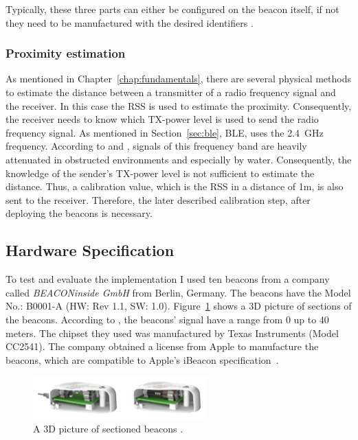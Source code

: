 \noindent Typically, these three parts can either be configured on the beacon itself, if not they need to be manufactured with the desired identifiers \citep{apple:getting_started,binside:ds}.

\subsubsection*{Proximity estimation}
As mentioned in Chapter~\ref{chap:fundamentals}, there are several physical methods to estimate the distance between a transmitter of a radio frequency signal and the receiver. In this case the \acf{RSS} is used to estimate the proximity. Consequently, the receiver needs to know which \acs{TX}-power level is used to send the radio frequency signal. As mentioned in Section~\ref{sec:ble}, \ac{BLE}, uses the 2.4~GHz frequency. According to \citet{apple:getting_started} and \citet{binside:ds}, signals of this frequency band are heavily attenuated in obstructed environments and especially by water. Consequently, the knowledge of the sender's \acs{TX}-power level is not sufficient to estimate the distance. Thus, a calibration value, which is the \acl{RSS} in a distance of 1m, is also sent to the receiver. Therefore, the later described calibration step, after deploying the beacons is necessary.

\subsection{Hardware Specification}
To test and evaluate the implementation I used ten beacons from a company called \emph{BEACONinside GmbH} from Berlin, Germany. The beacons have the Model No.: B0001-A (HW: Rev 1.1, SW: 1.0). Figure~\ref{fig:bi:beacons} shows a 3D picture of sections of the beacons. According to \citet{binside:ds}, the beacons' signal have a range from 0 up to 40 meters. The chipset they used was manufactured by Texas Instruments (Model CC2541). The company obtained a license from Apple to manufacture the beacons, which are compatible to Apple's iBeacon specification~\citep{binside:ds}.

\begin{figure}
	\includegraphics[width=0.6\textwidth]{figures/BEACONinside_beacons}
	\caption{A 3D picture of sectioned beacons \citep{binside:ds}.}
	\label{fig:bi:beacons}
\end{figure}

